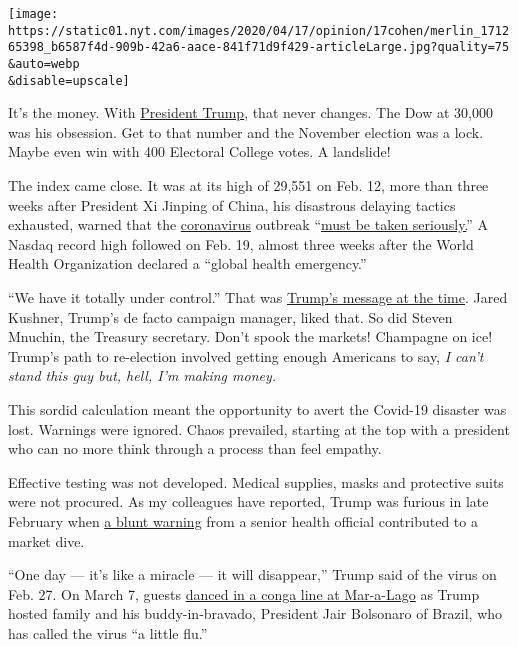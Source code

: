 \texttt{[image: https://static01.nyt.com/images/2020/04/17/opinion/17cohen/merlin\_171265398\_b6587f4d-909b-42a6-aace-841f71d9f429-articleLarge.jpg?quality=75\\\&auto=webp\\\&disable=upscale]}

It's the money. With
\href{https://www.nytimes.com/2020/05/07/us/politics/trump-coronavirus-fact-check.html}{President
Trump}, that never changes. The Dow at 30,000 was his obsession. Get to
that number and the November election was a lock. Maybe even win with
400 Electoral College votes. A landslide!

The index came close. It was at its high of 29,551 on Feb. 12, more than
three weeks after President Xi Jinping of China, his disastrous delaying
tactics exhausted, warned that the
\href{https://www.nytimes.com/2020/05/07/us/politics/trump-coronavirus-fact-check.html}{coronavirus}
outbreak
``\href{https://apnews.com/14d7dcffa205d9022fa9ea593bb2a8c5}{must be
taken seriously.}'' A Nasdaq record high followed on Feb. 19, almost
three weeks after the World Health Organization declared a ``global
health emergency.''

``We have it totally under control.'' That was
\href{https://www.nytimes.com/2020/03/17/us/politics/trump-coronavirus.html}{Trump's
message at the time}. Jared Kushner, Trump's de facto campaign manager,
liked that. So did Steven Mnuchin, the Treasury secretary. Don't spook
the markets! Champagne on ice! Trump's path to re-election involved
getting enough Americans to say, \emph{I can't stand this guy but, hell,
I'm making money.}

This sordid calculation meant the opportunity to avert the Covid-19
disaster was lost. Warnings were ignored. Chaos prevailed, starting at
the top with a president who can no more think through a process than
feel empathy.

Effective testing was not developed. Medical supplies, masks and
protective suits were not procured. As my colleagues have reported,
Trump was furious in late February when
\href{https://www.nytimes.com/2020/04/11/us/politics/coronavirus-trump-response.html}{a
blunt warning} from a senior health official contributed to a market
dive.

``One day --- it's like a miracle --- it will disappear,'' Trump said of
the virus on Feb. 27. On March 7, guests
\href{https://www.nytimes.com/2020/03/14/us/politics/trump-coronavirus-mar-a-lago.html}{danced
in a conga line at Mar-a-Lago} as Trump hosted family and his
buddy-in-bravado, President Jair Bolsonaro of Brazil, who has called the
virus ``a little flu.''

